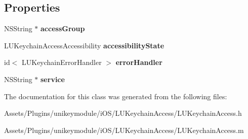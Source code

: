 \subsection*{Properties}
\begin{DoxyCompactItemize}
\item 
\mbox{\label{interface_l_u_keychain_access_adc9ae3c1ac74d700df0ca3ccae4a5a34}} 
N\+S\+String $\ast$ {\bfseries access\+Group}
\item 
\mbox{\label{interface_l_u_keychain_access_a8b0f24a0ed9b9138dcfcace353d99e00}} 
L\+U\+Keychain\+Access\+Accessibility {\bfseries accessibility\+State}
\item 
\mbox{\label{interface_l_u_keychain_access_acc5b5f576850765ec8964fc955005a08}} 
id$<$ L\+U\+Keychain\+Error\+Handler $>$ {\bfseries error\+Handler}
\item 
\mbox{\label{interface_l_u_keychain_access_a09dff710bf73e789518b04c664469624}} 
N\+S\+String $\ast$ {\bfseries service}
\end{DoxyCompactItemize}


The documentation for this class was generated from the following files\+:\begin{DoxyCompactItemize}
\item 
Assets/\+Plugins/unikeymodule/i\+O\+S/\+L\+U\+Keychain\+Access/L\+U\+Keychain\+Access.\+h\item 
Assets/\+Plugins/unikeymodule/i\+O\+S/\+L\+U\+Keychain\+Access/L\+U\+Keychain\+Access.\+m\end{DoxyCompactItemize}
